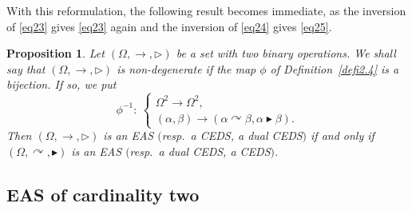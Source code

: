 \documentclass[pdftex]{sigma}
\numberwithin{equation}{section}
\newtheorem{Proposition}[Theorem]{Proposition}
 { \theoremstyle{definition}
\newtheorem{Definition}[Theorem]{Definition}
\newtheorem{Note}[Theorem]{Note}
\newtheorem{Example}[Theorem]{Example}
\newtheorem{Remark}[Theorem]{Remark}
\newtheorem{Notation}[Theorem]{Notation}}
\begin{document}
With this reformulation, the following result becomes immediate, as the
inversion of \eqref{eq23} gives \eqref{eq23} again and the inversion of \eqref{eq24} gives \eqref{eq25}.

\begin{Proposition}\label{prop2.7}
Let $(\Omega, \rightarrow,\triangleright)$ be a set with two binary operations. We shall say that $(\Omega,\rightarrow, \triangleright)$ is non-degenerate if the map $\phi$ of Definition~{\rm\ref{defi2.4}} is a bijection. If so, we put
\[\phi^{-1}\colon \ \begin{cases}
\Omega^2 \longrightarrow \Omega^2,\\
(\alpha,\beta) \longrightarrow (\alpha\curvearrowright \beta,\alpha \blacktriangleright \beta).
\end{cases}\]
Then $(\Omega,\rightarrow,\triangleright)$ is an EAS $($resp.\ a CEDS, a dual CEDS$)$ if and only if $(\Omega,\curvearrowright,\blacktriangleright)$ is an EAS $($resp.\ a dual CEDS, a CEDS$)$.
\end{Proposition}

\subsection{EAS of cardinality two}
\end{document}
